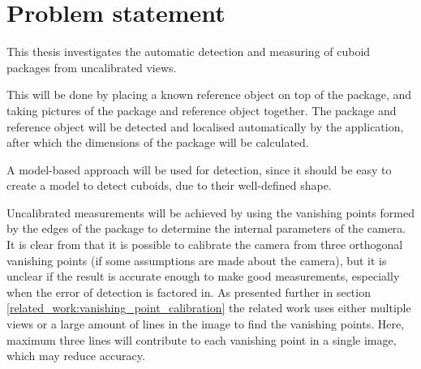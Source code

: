 %

\section{Problem statement}\label{problem-statement}
This thesis investigates the automatic detection and measuring of cuboid packages from uncalibrated views.

This will be done by placing a known reference object on top of the package, and taking pictures of the package and reference object together.
The package and reference object will be detected and localised automatically by the application, after which the dimensions of the package will be calculated.

A model-based approach will be used for detection, since it should be easy to create a model to detect cuboids, due to their well-defined shape.

Uncalibrated measurements will be achieved by using the vanishing points formed by the edges of the package to determine the internal parameters of the camera.	
It is clear from \cite{hartley-zisserman} that it is possible to calibrate the camera from three orthogonal vanishing points (if some assumptions are made about the camera), but it is unclear if the result is accurate enough to make good measurements, especially when the error of detection is factored in. 
As presented further in section \ref{related_work:vanishing_point_calibration} the related work uses either multiple views or a large amount of lines in the image to find the vanishing points.
Here, maximum three lines will contribute to each vanishing point in a single image, which may reduce accuracy.

